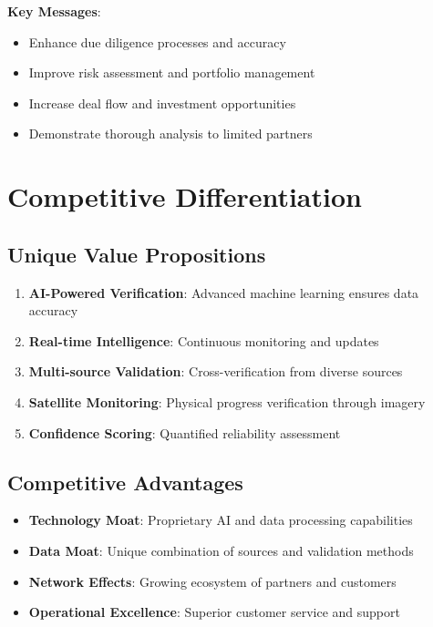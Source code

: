 \documentclass[business]{../templates/infraradar-main}
\begin{document}
\textbf{Key Messages}:
\begin{itemize}
    \item Enhance due diligence processes and accuracy
    \item Improve risk assessment and portfolio management
    \item Increase deal flow and investment opportunities
    \item Demonstrate thorough analysis to limited partners
\end{itemize}

\section{Competitive Differentiation}

\subsection{Unique Value Propositions}
\begin{enumerate}
    \item \textbf{AI-Powered Verification}: Advanced machine learning ensures data accuracy
    \item \textbf{Real-time Intelligence}: Continuous monitoring and updates
    \item \textbf{Multi-source Validation}: Cross-verification from diverse sources
    \item \textbf{Satellite Monitoring}: Physical progress verification through imagery
    \item \textbf{Confidence Scoring}: Quantified reliability assessment
\end{enumerate}

\subsection{Competitive Advantages}
\begin{itemize}
    \item \textbf{Technology Moat}: Proprietary AI and data processing capabilities
    \item \textbf{Data Moat}: Unique combination of sources and validation methods
    \item \textbf{Network Effects}: Growing ecosystem of partners and customers
    \item \textbf{Operational Excellence}: Superior customer service and support
\end{itemize}
\end{document}
